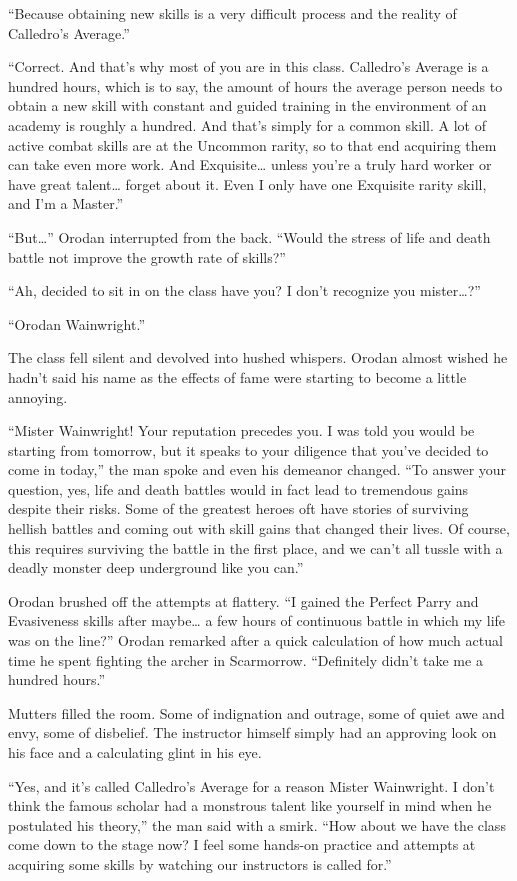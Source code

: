 \documentclass[a4paper,10pt]{book}
\begin{document}
“Because obtaining new skills is a very difficult process and the reality of Calledro's Average.”\par
“Correct. And that’s why most of you are in this class. Calledro’s Average is a hundred hours, which is to say, the amount of hours the average person needs to obtain a new skill with constant and guided training in the environment of an academy is roughly a hundred. And that’s simply for a common skill. A lot of active combat skills are at the Uncommon rarity, so to that end acquiring them can take even more work. And Exquisite… unless you’re a truly hard worker or have great talent… forget about it. Even I only have one Exquisite rarity skill, and I’m a Master.”\par
“But…” Orodan interrupted from the back. “Would the stress of life and death battle not improve the growth rate of skills?”\par
“Ah, decided to sit in on the class have you? I don’t recognize you mister…?”\par
“Orodan Wainwright.”\par
The class fell silent and devolved into hushed whispers. Orodan almost wished he hadn’t said his name as the effects of fame were starting to become a little annoying.\par
“Mister Wainwright! Your reputation precedes you. I was told you would be starting from tomorrow, but it speaks to your diligence that you’ve decided to come in today,” the man spoke and even his demeanor changed. “To answer your question, yes, life and death battles would in fact lead to tremendous gains despite their risks. Some of the greatest heroes oft have stories of surviving hellish battles and coming out with skill gains that changed their lives. Of course, this requires surviving the battle in the first place, and we can’t all tussle with a deadly monster deep underground like you can.”\par
Orodan brushed off the attempts at flattery. “I gained the Perfect Parry and Evasiveness skills after maybe… a few hours of continuous battle in which my life was on the line?” Orodan remarked after a quick calculation of how much actual time he spent fighting the archer in Scarmorrow. “Definitely didn’t take me a hundred hours.”\par
Mutters filled the room. Some of indignation and outrage, some of quiet awe and envy, some of disbelief. The instructor himself simply had an approving look on his face and a calculating glint in his eye.\par
“Yes, and it’s called Calledro’s Average for a reason Mister Wainwright. I don’t think the famous scholar had a monstrous talent like yourself in mind when he postulated his theory,” the man said with a smirk. “How about we have the class come down to the stage now? I feel some hands-on practice and attempts at acquiring some skills by watching our instructors is called for.”\par
\end{document}
